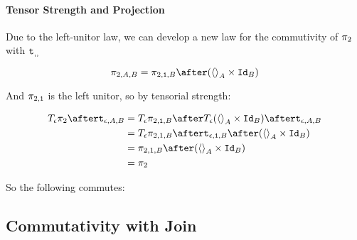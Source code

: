 {\paragraph{Tensor Strength and Projection}
Due to the left-unitor law, we can develop a new law for the commutivity of $\pi_2$ with $\texttt{t}_{, , }$

    $$\pi_{2, A, B} = \pi_{2, \1, B} \after (\term{A} \times \Id{B})$$

    And $\pi_{2, \texttt{1}}$ is the left unitor, so by tensorial strength:
    
    \begin{equation}
        \begin{split}
            \T{\e}{\pp} \after \tstrength{\e}{A}{B} & = \T{\e}{\pi_{2, \1, B}} \after \T{\e}{(\term{A} \times \Id{B})} \after \tstrength{\e}{A}{B} \\
            & = \T{\e}{\pi_{2, 1, B}} \after \tstrength{\e}{\1}{B} \after (\term{A} \times \Id{B}) \\
            & = \pi_{2,1,B} \after (\term{A} \times \Id{B}) \\
            & = \pp
        \end{split}
    \end{equation}

So the following commutes:



\subsection{Commutativity with Join}

}
